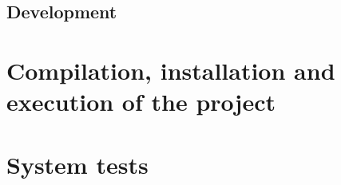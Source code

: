\subsection{Development}

\section{Compilation, installation and execution of the project}


\section{System tests}

